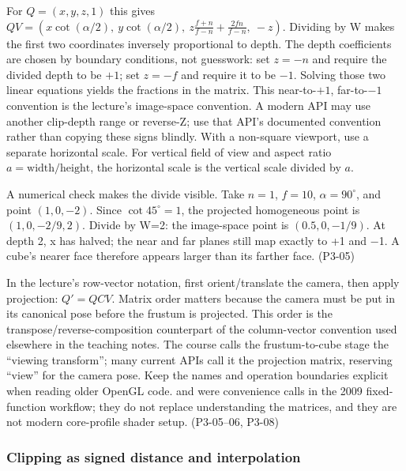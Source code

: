 For \(Q=(x,y,z,1)\) this gives \(Q V=(x\cot(\alpha/2),\ y\cot(\alpha/2),\ z\frac{f+n}{f-n}+\frac{2fn}{f-n},\ -z)\). Dividing by W makes the first two coordinates inversely proportional to depth. The depth coefficients are chosen by boundary conditions, not guesswork: set \(z=-n\) and require the divided depth to be \(+1\); set \(z=-f\) and require it to be \(-1\). Solving those two linear equations yields the fractions in the matrix. This near-to-\(+1\), far-to-\(-1\) convention is the lecture's image-space convention. A modern API may use another clip-depth range or reverse-Z; use that API's documented convention rather than copying these signs blindly. With a non-square viewport, use a separate horizontal scale. For vertical field of view and aspect ratio \(a=\text{width}/\text{height}\), the horizontal scale is the vertical scale divided by \(a\).

A numerical check makes the divide visible. Take \(n=1\), \(f=10\), \(\alpha=90^\circ\), and point \((1,0,-2)\). Since \(\cot45^\circ=1\), the projected homogeneous point is \((1,0,-2/9,2)\). Divide by W=2: the image-space point is \((0.5,0,-1/9)\). At depth 2, x has halved; the near and far planes still map exactly to +1 and −1. A cube's nearer face therefore appears larger than its farther face. (P3-05)

In the lecture's row-vector notation, first orient/translate the camera, then apply projection: \(Q'=QCV\). Matrix order matters because the camera must be put in its canonical pose before the frustum is projected. This order is the transpose/reverse-composition counterpart of the column-vector convention used elsewhere in the teaching notes. The course calls the frustum-to-cube stage the ``viewing transform''; many current APIs call it the projection matrix, reserving ``view'' for the camera pose. Keep the names and operation boundaries explicit when reading older OpenGL code.  and  were convenience calls in the 2009 fixed-function workflow; they do not replace understanding the matrices, and they are not modern core-profile shader setup. (P3-05--06, P3-08)

\subsubsection{Clipping as signed distance and interpolation}\label{03-visual-computing-i-ch003-clipping-as-signed-distance-and-interpolation}

